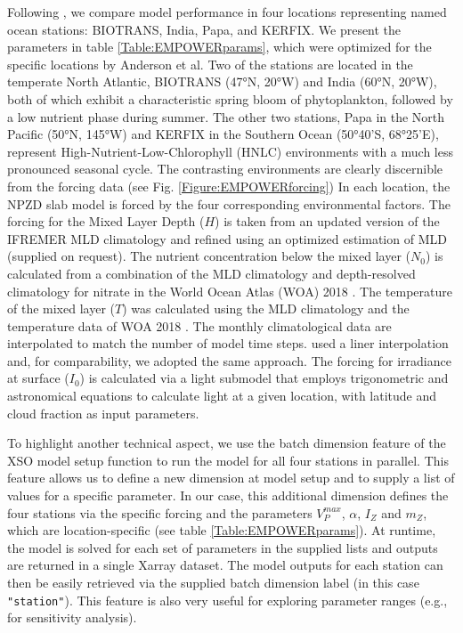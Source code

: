 \documentclass[journal abbreviation, manuscript]{copernicus}
\begin{document}
Following \citet{Anderson2015c}, we compare model performance in four locations representing named ocean stations: BIOTRANS, India, Papa, and KERFIX. We present the parameters in table \ref{Table:EMPOWERparams}, which were optimized for the specific locations by Anderson et al. Two of the stations are located in the temperate North Atlantic, BIOTRANS (47°N, 20°W) and India (60°N, 20°W), both of which exhibit a characteristic spring bloom of phytoplankton, followed by a low nutrient phase during summer. The other two stations, Papa in the North Pacific (50°N, 145°W) and KERFIX in the Southern Ocean (50°40'S, 68°25'E), represent High-Nutrient-Low-Chlorophyll (HNLC) environments with a much less pronounced seasonal cycle. The contrasting environments are clearly discernible from the forcing data (see Fig. \ref{Figure:EMPOWERforcing})
In each location, the NPZD slab model is forced by the four corresponding environmental factors. 
The forcing for the Mixed Layer Depth ($H$) is taken from an updated version of the IFREMER MLD climatology \citep{DeBoyerMontegut2004} and refined using an optimized estimation of MLD (supplied on request).
The nutrient concentration below the mixed layer ($N_0$) is calculated from a combination of the MLD climatology and depth-resolved climatology for nitrate in the World Ocean Atlas (WOA) 2018 \citep{Garcia2019WORLDSilicate}. The temperature of the mixed layer ($T$) was calculated using the MLD climatology and the temperature data of WOA 2018 \citep{Locarnini2019WorldTemperature}. The monthly climatological data are interpolated to match the number of model time steps. \citet{Anderson2015c} used a liner interpolation and, for comparability, we adopted the same approach.
The forcing for irradiance at surface ($I_{0}$) is calculated via a light submodel that employs trigonometric and astronomical equations to calculate light at a given location, with latitude and cloud fraction as input parameters.

To highlight another technical aspect, we use the batch dimension feature of the XSO model setup function to run the model for all four stations in parallel. This feature allows us to define a new dimension at model setup and to supply a list of values for a specific parameter. In our case, this additional dimension defines the four stations via the specific forcing and the parameters $V_P^{max}$, $\alpha$, $I_Z$ and $m_Z$, which are location-specific (see table \ref{Table:EMPOWERparams}). At runtime, the model is solved for each set of parameters in the supplied lists and outputs are returned in a single Xarray dataset. The model outputs for each station can then be easily retrieved via the supplied batch dimension label (in this case \texttt{"station"}). This feature is also very useful for exploring parameter ranges (e.g., for sensitivity analysis).
\end{document}
